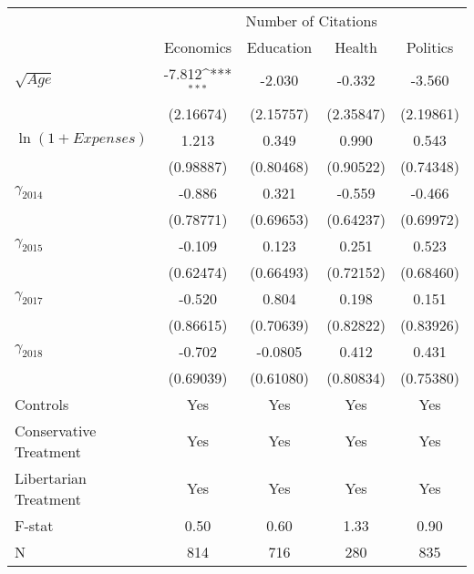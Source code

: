 \def\sym#1{\ifmmode^{#1}\else\(^{#1}\)\fi}
\setlength\tabcolsep{15pt}
\begin{tabular}{@{\extracolsep{7pt}}lcccc}
\toprule
                    &\multicolumn{4}{c}{Number of Citations}                                                \\\cmidrule(lr){2-5}
                    &\multicolumn{1}{c}{Economics}         &\multicolumn{1}{c}{Education}         &\multicolumn{1}{c}{Health}         &\multicolumn{1}{c}{Politics}         \\
\midrule
$\sqrt{Age}$        &      -7.812\sym{***}&      -2.030         &      -0.332         &      -3.560         \\
                    &   (2.16674)         &   (2.15757)         &   (2.35847)         &   (2.19861)         \\
\addlinespace
\small $\ln(1+Expenses)$&       1.213         &       0.349         &       0.990         &       0.543         \\
                    &   (0.98887)         &   (0.80468)         &   (0.90522)         &   (0.74348)         \\
\addlinespace
\large $\gamma_{2014}$&      -0.886         &       0.321         &      -0.559         &      -0.466         \\
                    &   (0.78771)         &   (0.69653)         &   (0.64237)         &   (0.69972)         \\
\addlinespace
\large $\gamma_{2015}$&      -0.109         &       0.123         &       0.251         &       0.523         \\
                    &   (0.62474)         &   (0.66493)         &   (0.72152)         &   (0.68460)         \\
\addlinespace
\large $\gamma_{2017}$&      -0.520         &       0.804         &       0.198         &       0.151         \\
                    &   (0.86615)         &   (0.70639)         &   (0.82822)         &   (0.83926)         \\
\addlinespace
\large $\gamma_{2018}$&      -0.702         &     -0.0805         &       0.412         &       0.431         \\
                    &   (0.69039)         &   (0.61080)         &   (0.80834)         &   (0.75380)         \\
\midrule
Controls            &         Yes         &         Yes         &         Yes         &         Yes         \\
Conservative Treatment&         Yes         &         Yes         &         Yes         &         Yes         \\
Libertarian Treatment&         Yes         &         Yes         &         Yes         &         Yes         \\
F-stat              &       0.50         &       0.60         &       1.33         &       0.90         \\
N                   &         814         &         716         &         280         &         835         \\
\bottomrule
\end{tabular}

